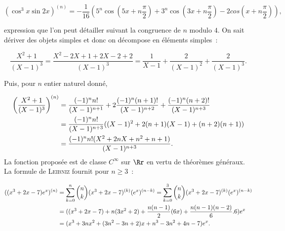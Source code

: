 {{$$(\cos^3x\sin2x)^{(n)}=-\frac{1}{16}(5^n\cos(5x+n\frac{\pi}{2})+3^n\cos(3x+n\frac{\pi}{2})-2cos(x+n\frac{\pi}{2})),$$

expression que l'on peut détailler suivant la congruence de $n$ modulo $4$.
On sait dériver des objets simples et donc on décompose en éléments simples~:

$$\frac{X^2+1}{(X-1)^3}=\frac{X^2-2X+1+2X-2+2}{(X-1)^3}=\frac{1}{X-1}+\frac{2}{(X-1)^2}+\frac{2}{(X-1)^3}.$$

Puis, pour $n$ entier naturel donné,

\begin{align*}\ensuremath
\left(\frac{X^2+1}{(X-1)^3}\right)^{(n)}&=\frac{(-1)^nn!}{(X-1)^{n+1}}+2\frac{(-1)^n(n+1)!}{(X-1)^{n+2}}+\frac{(-1)^n(n+2)!}{(X-1)^{n+3}}\\
 &=\frac{(-1)^nn!}{(X-1)^{n+3}}((X-1)^2+2(n+1)(X-1)+(n+2)(n+1))\\
 &=\frac{(-1)^nn!(X^2+2nX+n^2+n+1)}{(X-1)^{n+3}}.
\end{align*}
La fonction proposée est de classe $C^\infty$ sur $\Rr$ en vertu de théorèmes généraux. La formule de \textsc{Leibniz} fournit pour $n\geq3$~:

\begin{align*}\ensuremath
((x^3+2x-7)e^x)^{(n)}&=\sum_{k=0}^{n}\dbinom{n}{k}(x^3+2x-7)^{(k)}(e^x)^{(n-k)}=\sum_{k=0}^{3}\dbinom{n}{k}(x^3+2x-7)^{(k)}(e^x)^{(n-k)}\\
 &=((x^3+2x-7)+n(3x^2+2)+\frac{n(n-1)}{2}(6x)+\frac{n(n-1)(n-2)}{6}.6)e^x\\
 &=(x^3+3nx^2+(3n^2-3n+2)x+n^3-3n^2+4n-7)e^x.
\end{align*}
}
}
